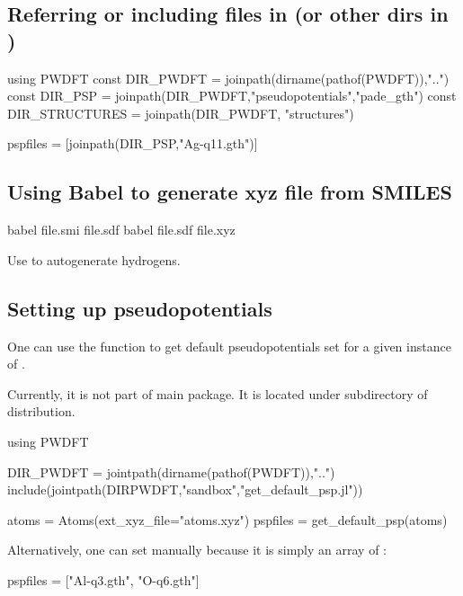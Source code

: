 \subsection{Referring or including files in  (or other dirs in )}

\begin{juliacode}
using PWDFT
const DIR_PWDFT = joinpath(dirname(pathof(PWDFT)),"..")
const DIR_PSP = joinpath(DIR_PWDFT,"pseudopotentials","pade_gth")
const DIR_STRUCTURES = joinpath(DIR_PWDFT, "structures")

pspfiles = [joinpath(DIR_PSP,"Ag-q11.gth")]
\end{juliacode}


\subsection{Using Babel to generate xyz file from SMILES}

\begin{textcode}
babel file.smi file.sdf
babel file.sdf file.xyz
\end{textcode}

Use  to autogenerate hydrogens.



\subsection{Setting up pseudopotentials}

One can use the function  to get default
pseudopotentials set for a given instance of .

Currently, it is not part of main  package. It is located
under  subdirectory of  distribution.

\begin{juliacode}
using PWDFT

DIR_PWDFT = jointpath(dirname(pathof(PWDFT)),"..")
include(jointpath(DIRPWDFT,"sandbox","get_default_psp.jl"))

atoms = Atoms(ext_xyz_file="atoms.xyz")
pspfiles = get_default_psp(atoms)
\end{juliacode}

Alternatively, one can set  manually because it is simply
an array of :
\begin{juliacode}
pspfiles = ["Al-q3.gth", "O-q6.gth"]
\end{juliacode}

